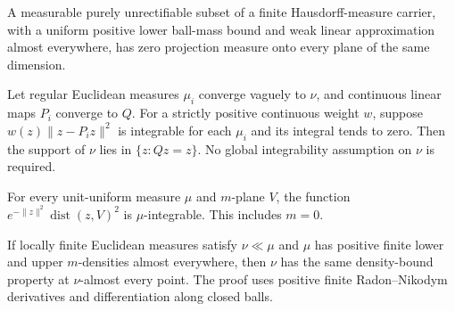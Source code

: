 \begin{lemma}
\label{lem:fixed-lower-density-projection-null}

A measurable purely unrectifiable subset of a finite Hausdorff-measure carrier, with a uniform positive lower ball-mass bound and weak linear approximation almost everywhere, has zero projection measure onto every plane of the same dimension.
\end{lemma}

\begin{lemma}
\label{lem:weighted-energy-limit-support}

Let regular Euclidean measures $\mu_i$ converge vaguely to $\nu$, and continuous linear maps $P_i$ converge to $Q$. For a strictly positive continuous weight $w$, suppose $w(z)\lVert z-P_i z\rVert^2$ is integrable for each $\mu_i$ and its integral tends to zero. Then the support of $\nu$ lies in $\{z:Qz=z\}$. No global integrability assumption on $\nu$ is required.
\end{lemma}

\begin{lemma}
\label{lem:gaussian-plane-energy-integrable}

For every unit-uniform measure $\mu$ and $m$-plane $V$, the function $e^{-\lVert z\rVert^2}\operatorname{dist}(z,V)^2$ is $\mu$-integrable. This includes $m=0$.
\end{lemma}

\begin{lemma}
\label{lem:absolute-continuity-density-bounds}

If locally finite Euclidean measures satisfy $\nu\ll\mu$ and $\mu$ has positive finite lower and upper $m$-densities almost everywhere, then $\nu$ has the same density-bound property at $\nu$-almost every point. The proof uses positive finite Radon--Nikodym derivatives and differentiation along closed balls.
\end{lemma}

